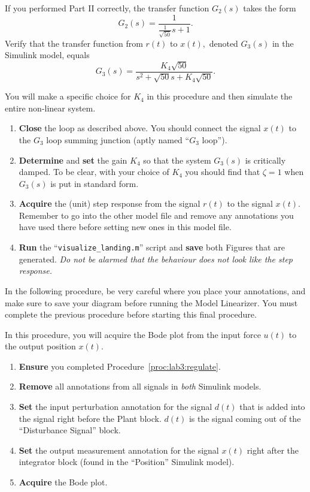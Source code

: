 %
If you performed Part II correctly, the transfer function \(G_2(s)\) takes the
form
\[
  G_2(s) = \frac{1}{\frac{1}{\sqrt{50}}s + 1}.
\]
Verify that the transfer function from \(r(t)\) to \(x(t),\) denoted \(G_3(s)\) in the Simulink model, equals
\[
  G_3(s) = \frac{K_4\sqrt{50}}{s^2 + \sqrt{50} s + K_4 \sqrt{50}}.
\]
%
\begin{procedure}[label={proc:lab3:regulate}]
  You will make a specific choice for \(K_4\) in this procedure and then simulate the entire non-linear system.
  \begin{enumerate}[label={(\arabic*)}]
    \item{%
      \textbf{Close} the loop as described above.
      You should connect the signal \(x(t)\) to the \(G_3\) loop summing junction (aptly named ``\(G_3\) loop'').%
    }
    \item{%
      \textbf{Determine} and \textbf{set} the gain \(K_4\) so that the system \(G_3(s)\) is critically damped.
      To be clear, with your choice of \(K_4\) you should find that \(\zeta = 1\) when \(G_3(s)\) is put in standard form.%
    }
    \item{%
      \textbf{Acquire} the (unit) step response from the signal \(r(t)\) to the signal \(x(t).\)
      Remember to go into the other model file and remove any annotations you have used there before setting new ones in this model file.%
    }
    \item{%
      \textbf{Run} the ``\texttt{visualize\_landing.m}'' script and \textbf{save} both Figures that are generated.%
      \emph{Do not be alarmed that the behaviour does not look like the step response.}
    }
  \end{enumerate}
\end{procedure}
%
In the following procedure, be very careful where you place your annotations, and make sure to save your diagram before running the Model Linearizer.
You must complete the previous procedure before starting this final procedure.
%
\begin{procedure}[label={proc:lab3:disturbance}]
  In this procedure, you will acquire the Bode plot from the input force \(u(t)\) to the output position \(x(t).\)
  \begin{enumerate}[label={(\arabic*)}]
    \item{%
      \textbf{Ensure} you completed Procedure~\ref{proc:lab3:regulate}.
    }
    \item{%
      \textbf{Remove} all annotations from all signals in \emph{both} Simulink models.
    }
    \item{%
      \textbf{Set} the input perturbation annotation for the signal \(d(t)\) that is added into the signal right before the Plant block.
      \(d(t)\) is the signal coming out of the ``Disturbance Signal'' block.
    }
    \item{%
      \textbf{Set} the output measurement annotation for the signal \(x(t)\) right after the integrator block (found in the ``Position'' Simulink model).
    }
    \item{%
      \textbf{Acquire} the Bode plot.
    }
  \end{enumerate}
\end{procedure}
%

